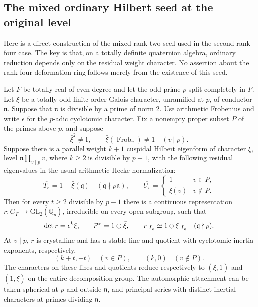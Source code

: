 \subsection{The mixed ordinary Hilbert seed at the original level}
\label{sec:mixed-hilbert-seed}

Here is a direct construction of the mixed rank-two seed used in the
second rank-four case. The key is that, on a totally definite
quaternion algebra, ordinary reduction depends only on the residual
weight character. No assertion about the rank-four deformation ring
follows merely from the existence of this seed.

\begin{theorem}\label{thm:mixed-weight-change}
Let \(F\) be totally real of even degree and let the odd prime \(p\)
split completely in \(F\). Let \(\xi\) be a totally odd finite-order
Galois character, unramified at \(p\), of conductor \(\mathfrak n\).
Suppose that \(\mathfrak n\) is divisible by a prime of norm \(2\).
Use arithmetic Frobenius and write \(\epsilon\) for the \(p\)-adic
cyclotomic character. Fix a nonempty proper subset \(P\) of the primes
above \(p\), and suppose
\[
 \bar\xi^2\ne1,\qquad
 \bar\xi(\operatorname{Frob}_v)\ne1\quad(v\mid p).
\]
Suppose there is a parallel weight \(k+1\) cuspidal Hilbert eigenform
of character \(\xi\), level \(\mathfrak n\prod_{v\mid p}v\), where
\(k\ge2\) is divisible by \(p-1\), with the following residual
eigenvalues in the usual arithmetic Hecke normalization:
\[
 \overline{T_{\mathfrak q}}=1+\bar\xi(\mathfrak q)
 \quad(\mathfrak q\nmid p\mathfrak n),\qquad
 \overline{U_v}=
 \begin{cases}1&v\in P,\\ \bar\xi(v)&v\notin P.\end{cases}
\]
Then for every \(t\ge2\) divisible by \(p-1\) there is a continuous
representation \(r:G_F\to\mathrm{GL}_2(\overline{\mathbb Q}_p)\),
irreducible on every open subgroup, such that
\[
 \det r=\epsilon^k\xi,\qquad
 \bar r^{\rm ss}=1\oplus\bar\xi,\qquad
 r|_{I_{\mathfrak q}}\simeq1\oplus\xi|_{I_{\mathfrak q}}
       \quad(\mathfrak q\nmid p).
\]
At \(v\mid p\), \(r\) is crystalline and has a stable line and
quotient with cyclotomic inertia exponents, respectively,
\[
 (k+t,-t)\quad(v\in P),\qquad (k,0)\quad(v\notin P).
\]
The characters on these lines and quotients reduce respectively to
\((\bar\xi,1)\) and \((1,\bar\xi)\) on the entire decomposition
group. The automorphic attachment can be taken spherical at \(p\)
and outside \(\mathfrak n\), and principal series with distinct
inertial characters at primes dividing \(\mathfrak n\).
\end{theorem}

